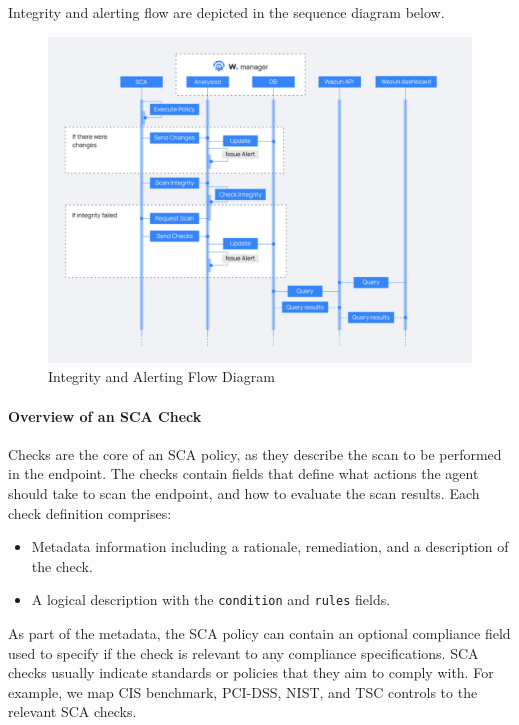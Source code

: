 Integrity and alerting flow are depicted in the sequence diagram below.
\begin{figure} [H]
    \centering
    \includegraphics[width=\textwidth]{images/sca/sca-11.png}
    \caption{Integrity and Alerting Flow Diagram}
    \label{fig:sca-11}
\end{figure}

\paragraph{Overview of an SCA Check}
Checks are the core of an SCA policy, as they describe the scan to be performed in the endpoint. The checks contain fields that define what actions the agent should take to scan the endpoint, and how to evaluate the scan results. Each check definition comprises:

\begin{itemize}
    \item Metadata information including a rationale, remediation, and a description of the check.
    \item A logical description with the \texttt{condition} and \texttt{rules} fields.
\end{itemize}

As part of the metadata, the SCA policy can contain an optional compliance field used to specify if the check is relevant to any compliance specifications. SCA checks usually indicate standards or policies that they aim to comply with. For example, we map CIS benchmark, PCI-DSS, NIST, and TSC controls to the relevant SCA checks.

